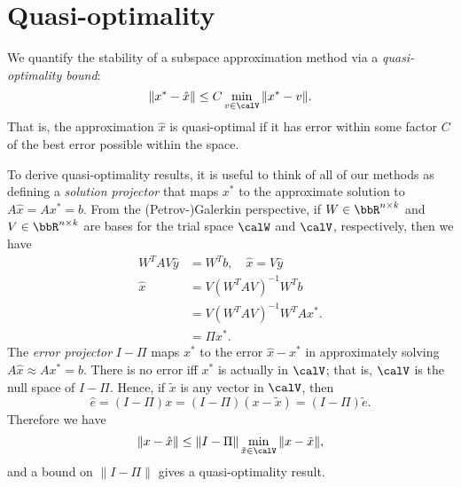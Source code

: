 \section{Quasi-optimality}

We quantify the stability of a subspace approximation method via
a {\em quasi-optimality bound}:
\[
  \|x^*-\hat{x}\| \leq C \min_{v \in \calV} \|x^*-v\|.
\]
That is, the approximation $\hat{x}$ is quasi-optimal if it has
error within some factor $C$ of the best error possible within the
space.

To derive quasi-optimality results, it is useful to think of all
of our methods as defining a {\em solution projector}
that maps $x^*$ to the approximate solution to $A\hat{x} = Ax^* = b$.
From the (Petrov-)Galerkin perspective, if $W \in \bbR^{n \times k}$
and $V \in \bbR^{n \times k}$ are bases for the trial space $\calW$
and $\calV$, respectively, then we have
\begin{align*}
  W^T A V \hat{y} &= W^T b, \quad \hat{x} = V \hat{y} \\
  \hat{x} &= V (W^T A V)^{-1} W^T b \\
          &= V (W^T A V)^{-1} W^T A x^*. \\
          &= \Pi x^*.
\end{align*}
The {\em error projector} $I-\Pi$ maps $x^*$ to the error $\hat{x}-x^*$
in approximately solving $A\hat{x} \approx Ax^* = b$.  There is no
error iff $x^*$ is actually in $\calV$; that is, $\calV$ is the
null space of $I-\Pi$.  Hence, if $\tilde{x}$ is any vector in $\calV$,
then
\[
  \hat{e} = (I-\Pi) x = (I-\Pi) (x-\tilde{x}) = (I-\Pi) \tilde{e}.
\]
Therefore we have
\[
  \|x-\hat{x}\| \leq \|I-\Pi\| \min_{\tilde{x} \in \calV} \|x-\tilde{x}\|,
\]
and a bound on $\|I-\Pi\|$ gives a quasi-optimality result.

